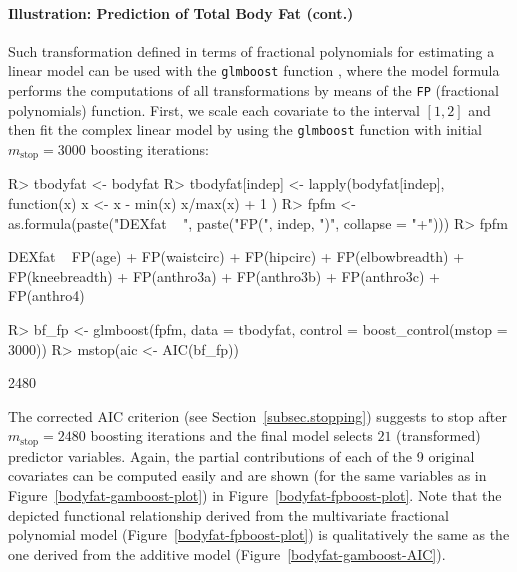 \documentclass{article}
\newcommand{\Rpackage}[1]{{\normalfont\fontseries{b}\selectfont #1}}
\newcommand{\Rcmd}[1]{\texttt{#1}}
\newenvironment{Schunk}{}{}
\begin{document}
 

\paragraph{Illustration: Prediction of Total Body Fat (cont.)}


Such transformation defined in terms
of fractional polynomials for estimating a linear model can be used with
the \Rcmd{glmboost} function 
\citep[an implementation of the original fractional polynomials approach is
available in package \Rpackage{mfp}, see][]{pkg:mfp,Sauerbreietal2006},
where the model formula performs the computations of all transformations by 
means of the \Rcmd{FP} (fractional polynomials) function. First, we scale
each covariate to the interval $[1,2]$ and then fit the complex linear model
by using the \Rcmd{glmboost} function with initial $m_\text{stop} = 3000$ boosting
iterations:
\begin{Schunk}
\begin{Sinput}
R> tbodyfat <- bodyfat
R> tbodyfat[indep] <- lapply(bodyfat[indep], function(x) {
         x <- x - min(x)
         x/max(x) + 1
     })
R> fpfm <- as.formula(paste("DEXfat ~ ", paste("FP(", 
         indep, ")", collapse = "+")))
R> fpfm
\end{Sinput}
\begin{Soutput}
DEXfat ~ FP(age) + FP(waistcirc) + FP(hipcirc) + FP(elbowbreadth) + 
    FP(kneebreadth) + FP(anthro3a) + FP(anthro3b) + FP(anthro3c) + 
    FP(anthro4)
\end{Soutput}
\begin{Sinput}
R> bf_fp <- glmboost(fpfm, data = tbodyfat, control = boost_control(mstop = 3000))
R> mstop(aic <- AIC(bf_fp))
\end{Sinput}
\begin{Soutput}
[1] 2480
\end{Soutput}
\end{Schunk}
The corrected AIC criterion (see Section~\ref{subsec.stopping}) suggests to
stop after $m_\text{stop} = 2480$ 
boosting iterations and the final model selects
$21$ (transformed) predictor
variables. Again, the partial 
contributions of each of the 9 original covariates can be computed
easily and are shown  
(for the same variables as in Figure~\ref{bodyfat-gamboost-plot}) in 
Figure~\ref{bodyfat-fpboost-plot}. Note that the depicted functional
relationship derived 
from the multivariate fractional polynomial model
(Figure~\ref{bodyfat-fpboost-plot}) is qualitatively the same as the one
derived from the additive model   
(Figure~\ref{bodyfat-gamboost-AIC}). 
\end{document}
